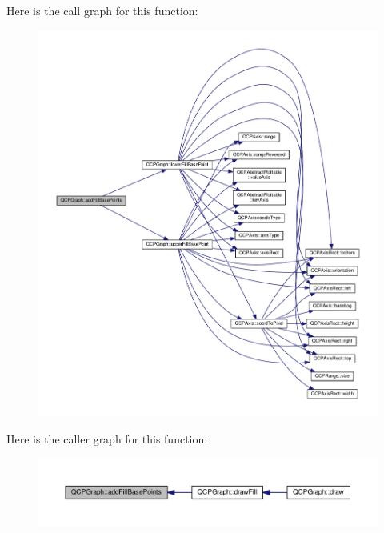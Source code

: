 Here is the call graph for this function\+:\nopagebreak
\begin{figure}[H]
\begin{center}
\leavevmode
\includegraphics[width=350pt]{class_q_c_p_graph_a5fa7884620d7c54b81dfbd255d97b636_cgraph}
\end{center}
\end{figure}




Here is the caller graph for this function\+:\nopagebreak
\begin{figure}[H]
\begin{center}
\leavevmode
\includegraphics[width=350pt]{class_q_c_p_graph_a5fa7884620d7c54b81dfbd255d97b636_icgraph}
\end{center}
\end{figure}


\hypertarget{class_q_c_p_graph_a5369f23863e04a6164f8b66d49fd18f4}{}
